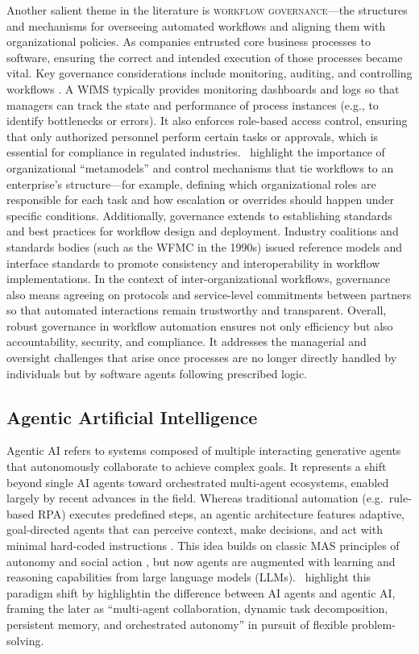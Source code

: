 Another salient theme in the literature is \textsc{workflow governance}—the structures and mechanisms for overseeing automated workflows and aligning them with organizational policies. As companies entrusted core business processes to software, ensuring the correct and intended execution of those processes became vital. Key governance considerations include monitoring, auditing, and controlling workflows \parencite[cf.][p. 131]{georgakopoulosOverview1995}. A WfMS typically provides monitoring dashboards and logs so that managers can track the state and performance of process instances (e.g., to identify bottlenecks or errors). It also enforces role-based access control, ensuring that only authorized personnel perform certain tasks or approvals, which is essential for compliance in regulated industries.~\textcite{basuResearch2002} highlight the importance of organizational \enquote{metamodels} and control mechanisms that tie workflows to an enterprise's structure---for example, defining which organizational roles are responsible for each task and how escalation or overrides should happen under specific conditions. Additionally, governance extends to establishing standards and best practices for workflow design and deployment. Industry coalitions and standards bodies (such as the WFMC in the 1990s) issued reference models and interface standards to promote consistency and interoperability in workflow implementations. In the context of inter-organizational workflows, governance also means agreeing on protocols and service-level commitments between partners so that automated interactions remain trustworthy and transparent. Overall, robust governance in workflow automation ensures not only efficiency but also accountability, security, and compliance. It addresses the managerial and oversight challenges that arise once processes are no longer directly handled by individuals but by software agents following prescribed logic.

\subsection{Agentic Artificial Intelligence}\label{subsec:agentic-ai}
Agentic AI refers to systems composed of multiple interacting generative agents that autonomously collaborate to achieve complex goals. It represents a shift beyond single AI agents toward orchestrated multi-agent ecosystems, enabled largely by recent advances in the field. Whereas traditional automation (e.g.~rule-based RPA) executes predefined steps, an agentic architecture features adaptive, goal-directed agents that can perceive context, make decisions, and act with minimal hard-coded instructions \parencite[cf.][pp. 8-9]{jenningsRoadmap1998}. This idea builds on classic MAS principles of autonomy and social action \parencite{castelfranchiModelling1998,ferberMultiagent1999}, but now agents are augmented with learning and reasoning capabilities from large language models (LLMs).~\textcite{sapkotaAI2026} highlight this paradigm shift by highlightin the difference between AI agents and agentic AI, framing the later as “multi-agent collaboration, dynamic task decomposition, persistent memory, and orchestrated autonomy” in pursuit of flexible problem-solving.


